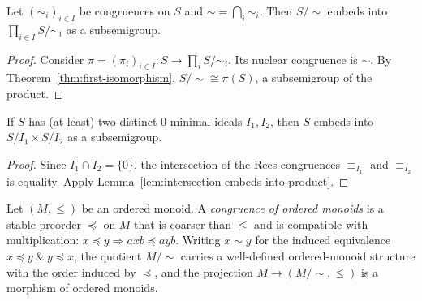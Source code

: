 \begin{lemma}
\label{lem:intersection-embeds-into-product}
Let \((\sim_i)_{i\in I}\) be congruences on \(S\) and \(\sim=\bigcap_i \sim_i\). Then \(S/{\sim}\) embeds into \(\prod_{i\in I} S/{\sim_i}\) as a subsemigroup.
\end{lemma}
\begin{proof}
Consider \(\pi=(\pi_i)_{i\in I}:S\to \prod_i S/{\sim_i}\). Its nuclear congruence is \(\sim\). By Theorem~\ref{thm:first-isomorphism}, \(S/{\sim}\cong \pi(S)\), a subsemigroup of the product.
\end{proof}

\begin{lemma}
\label{lem:zero-minimal-ideals-product-embed}
If \(S\) has (at least) two distinct \(0\)-minimal ideals \(I_1,I_2\), then \(S\) embeds into \(S/I_1 \times S/I_2\) as a subsemigroup.
\end{lemma}
\begin{proof}
Since \(I_1\cap I_2=\{0\}\), the intersection of the Rees congruences \(\equiv_{I_1}\) and \(\equiv_{I_2}\) is equality. Apply Lemma~\ref{lem:intersection-embeds-into-product}.
\end{proof}

\begin{definition}
\label{def:ordered-monoid-congruence}
Let \((M,\le)\) be an ordered monoid. A \emph{congruence of ordered monoids} is a stable preorder \(\preccurlyeq\) on \(M\) that is coarser than \(\le\) and is compatible with multiplication: \(x\preccurlyeq y\Rightarrow a x b \preccurlyeq a y b\). Writing \(x\sim y\) for the induced equivalence \(x\preccurlyeq y\ \&\ y\preccurlyeq x\), the quotient \(M/{\sim}\) carries a well-defined ordered-monoid structure with the order induced by \(\preccurlyeq\), and the projection \(M\to (M/{\sim},\le)\) is a morphism of ordered monoids.
\end{definition}